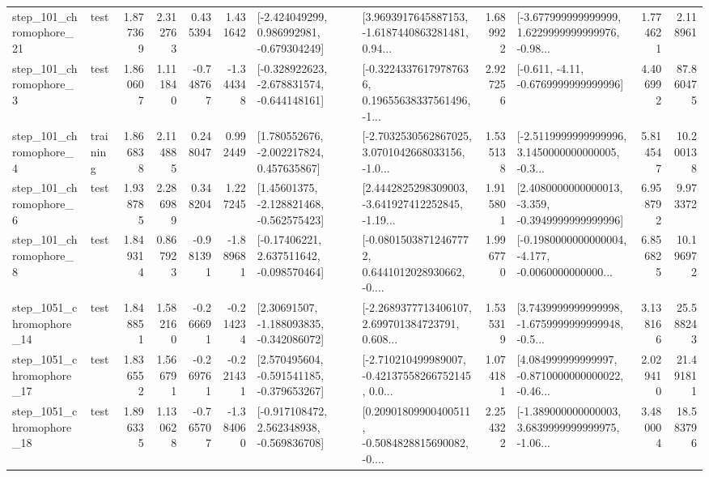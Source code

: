 \begin{tabular}{llrrrrllrlrr}
  step\_101\_chromophore\_21 &      test &      1.877369 &    2.312763 &      0.435394 &  1.431642 &   [-2.424049299, 0.986992981, -0.679304249] &  [3.9693917645887153, -1.6187440863281481, 0.94... &       1.689922 &  [-3.677999999999999, 1.6229999999999976, -0.98... &            1.774621 &          2.118961 \\
   step\_101\_chromophore\_3 &      test &      1.860607 &    1.111840 &     -0.748767 & -1.344348 &  [-0.328922623, -2.678831574, -0.644148161] &  [-0.32243376179787636, 0.19655638337561496, -1... &       2.927256 &               [-0.611, -4.11, -0.6769999999999996] &            4.406992 &         87.860475 \\
   step\_101\_chromophore\_4 &  training &      1.866838 &    2.114885 &      0.248047 &  0.992449 &    [1.780552676, -2.002217824, 0.457635867] &  [-2.7032530562867025, 3.0701042668033156, -1.0... &       1.535138 &  [-2.5119999999999996, 3.1450000000000005, -0.3... &            5.814547 &         10.200138 \\
   step\_101\_chromophore\_6 &      test &      1.938785 &    2.286989 &      0.348204 &  1.227245 &    [1.45601375, -2.128821468, -0.562575423] &  [2.4442825298309003, -3.641927412252845, -1.19... &       1.915801 &  [2.4080000000000013, -3.359, -0.3949999999999996] &            6.958792 &          9.973372 \\
   step\_101\_chromophore\_8 &      test &      1.849314 &    0.867923 &     -0.981391 & -1.889681 &    [-0.17406221, 2.637511642, -0.098570464] &  [-0.08015038712467772, 0.6441012028930662, -0.... &       1.996770 &  [-0.1980000000000004, -4.177, -0.0060000000000... &            6.856825 &         10.196972 \\
 step\_1051\_chromophore\_14 &      test &      1.848851 &    1.582160 &     -0.266691 & -0.214234 &    [2.30691507, -1.188093835, -0.342086072] &  [-2.2689377713406107, 2.699701384723791, 0.608... &       1.535319 &  [3.7439999999999998, -1.6759999999999948, -0.5... &            3.138166 &         25.588243 \\
 step\_1051\_chromophore\_17 &      test &      1.836552 &    1.566791 &     -0.269761 & -0.221431 &   [2.570495604, -0.591541185, -0.379653267] &  [-2.710210499989007, -0.42137558266752145, 0.0... &       1.074181 &  [4.084999999999997, -0.8710000000000022, -0.46... &            2.029410 &         21.491811 \\
 step\_1051\_chromophore\_18 &      test &      1.896335 &    1.130628 &     -0.765707 & -1.384060 &   [-0.917108472, 2.562348938, -0.569836708] &  [0.20901809900400511, -0.5084828815690082, -0.... &       2.254322 &  [-1.389000000000003, 3.6839999999999975, -1.06... &            3.480004 &         18.583796 \\

\end{tabular}
